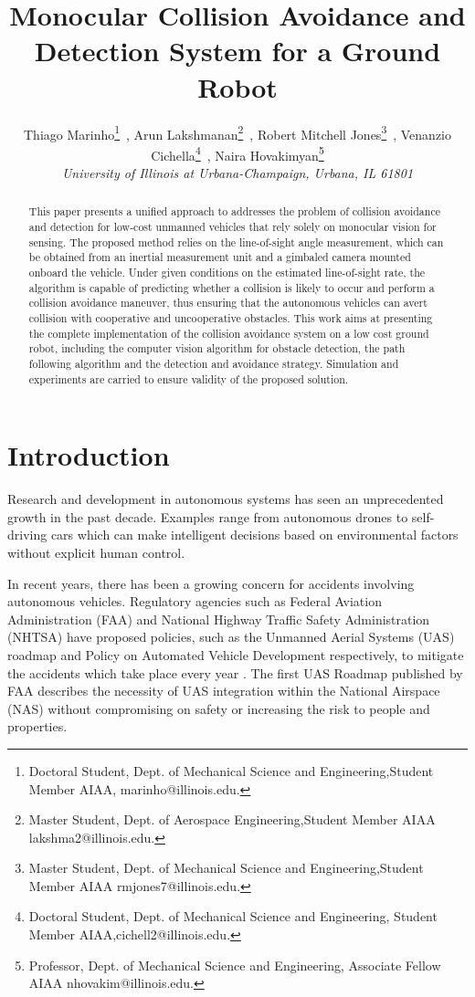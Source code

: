 \documentclass[]{aiaa-tc}%
\title{Monocular Collision Avoidance and Detection System for a Ground Robot}
\author{
   Thiago Marinho\thanks{Doctoral Student, Dept. of Mechanical Science and Engineering,Student Member AIAA, marinho@illinois.edu.}~,
   Arun Lakshmanan\thanks{Master Student, Dept. of Aerospace Engineering,Student Member AIAA lakshma2@illinois.edu.}~,
   Robert Mitchell Jones\thanks{Master Student,  Dept. of Mechanical Science and Engineering,Student Member AIAA rmjones7@illinois.edu.}~,
    Venanzio Cichella\thanks{Doctoral Student, Dept. of Mechanical Science and Engineering, Student Member AIAA,cichell2@illinois.edu.}~,
    Naira Hovakimyan\thanks{Professor, Dept. of Mechanical Science and Engineering, Associate Fellow AIAA
    nhovakim@illinois.edu.}\\
    {\normalsize\itshape University of Illinois at Urbana-Champaign, Urbana, IL 61801}
}
\begin{document}
\maketitle

\begin{abstract}

This paper presents a unified approach to addresses the problem of collision avoidance and detection for low-cost unmanned vehicles that rely solely on monocular vision for sensing. The proposed method relies on the line-of-sight angle measurement, which can be obtained from an inertial measurement unit and a gimbaled camera mounted onboard the vehicle. Under given conditions on the estimated line-of-sight rate, the algorithm is capable of predicting whether a collision is likely to occur and perform a collision avoidance maneuver, thus ensuring that the autonomous vehicles can avert collision with cooperative and uncooperative obstacles. This work aims at presenting the complete implementation of the collision avoidance system on a low cost ground robot, including the computer vision algorithm for obstacle detection, the path following algorithm and the detection and avoidance strategy. Simulation and experiments are carried to ensure validity of the proposed solution.
\end{abstract}



\section{Introduction}
\label{sec:Introduction}
Research and development in autonomous systems  has seen an unprecedented growth in the past decade. Examples range from autonomous drones to self-driving cars which can make intelligent decisions based on environmental factors without explicit human control.

In recent years, there has been a growing concern for accidents involving autonomous vehicles. Regulatory agencies such as Federal Aviation Administration (FAA) and National Highway Traffic Safety Administration (NHTSA) have proposed policies, such as the Unmanned Aerial Systems (UAS) roadmap \cite{FAA_UAS} and Policy on Automated Vehicle Development \cite{autodev2014} respectively, to mitigate the accidents which take place every year \cite{FAAaccd2010}. The first UAS Roadmap published by FAA describes the necessity of UAS integration within the National Airspace (NAS) without compromising on safety or increasing the risk to people and properties.
\end{document}
